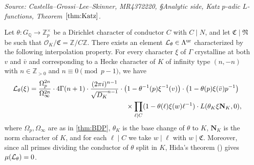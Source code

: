 \begin{theorem}
  \label{thm:Katz}
  \textit{Source: Castella--Grossi--Lee--Skinner, MR4372220, §Analytic side, Katz \(p\)-adic \(L\)-functions, Theorem~\(\ref{thm:Katz}\).}

  Let \(\theta : G_{\mathbb{Q}}\to\mathbb{Z}_p^\times\) be a Dirichlet character of conductor \(C\) with \(C\mid N\), and let \(\mathfrak{C}\mid\mathfrak{N}\) be such that \(\mathcal{O}_K/\mathfrak{C} = \mathbb{Z}/C\mathbb{Z}\). There exists an element \(\mathcal{L}_\theta\in\Lambda^{\mathrm{ur}}\) characterized by the following interpolation property. For every character \(\xi\) of \(\Gamma\) crystalline at both \(v\) and \(\bar{v}\) and corresponding to a Hecke character of \(K\) of infinity type \((n,-n)\) with \(n\in\mathbb{Z}_{>0}\) and \(n\equiv 0\pmod{p-1}\), we have
  \begin{align*}
    \mathcal{L}_\theta(\xi)
    = \frac{\Omega_p^{2n}}{\Omega_\infty^{2n}}\cdot 4\Gamma(n+1)\cdot\frac{(2\pi i)^{n-1}}{\sqrt{D_K}^{n-1}}
      &\cdot\bigl(1-\theta^{-1}(p)\xi^{-1}(v)\bigr)\cdot\bigl(1-\theta(p)\xi(\bar{v})p^{-1}\bigr)\\
      &\quad\times\prod_{\ell\mid C}(1-\theta(\ell)\xi(w)\ell^{-1})\cdot L(\theta_K\xi\mathbf{N}_K,0),
  \end{align*}
  where \(\Omega_p, \Omega_\infty\) are as in \cref{thm:BDP}, \(\theta_K\) is the base change of \(\theta\) to \(K\), \(\mathbf{N}_K\) is the norm character of \(K\), and for each \(\ell\mid C\) we take \(w\mid\ell\) with \(w\mid\mathfrak{C}\). Moreover, since all primes dividing the conductor of \(\theta\) split in \(K\), Hida's theorem (\cite{hidamu=0}) gives \(\mu(\mathcal{L}_\theta) = 0\).
\end{theorem}

